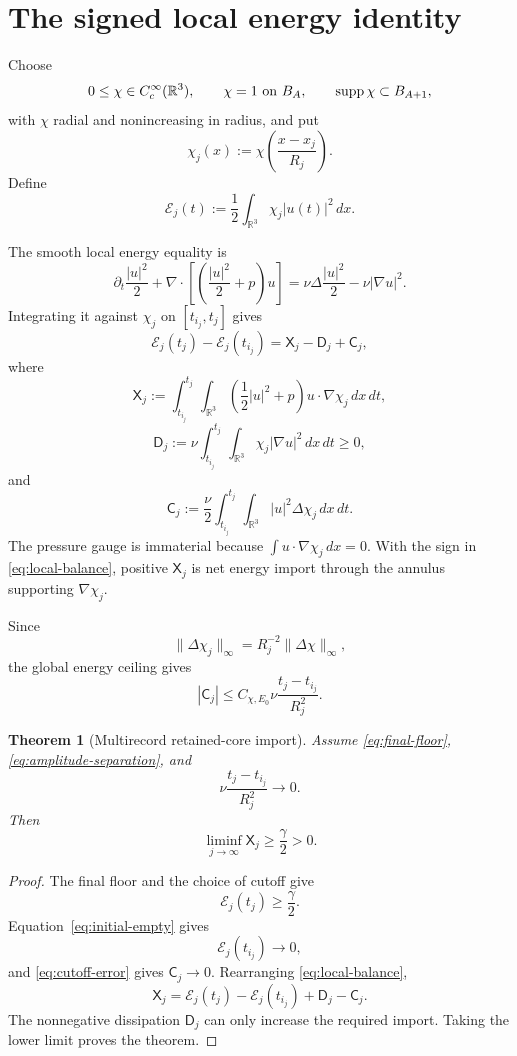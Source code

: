 \documentclass[11pt]{article}
\newtheorem{theorem}{Theorem}
\theoremstyle{remark}
\newcommand{\R}{\mathbb R}
\begin{document}
\section{The signed local energy identity}

Choose
\[
 0\le\chi\in C_c^\infty(\R^3),
 \qquad
 \chi=1\ \hbox{on }B_A,
 \qquad
 \operatorname{supp}\chi\subset B_{A+1},
\]
with \(\chi\) radial and nonincreasing in radius, and put
\[
 \chi_j(x):=
 \chi\left(\frac{x-x_j}{R_j}\right).
\]
Define
\[
 \mathcal E_j(t)
 :=
 \frac12\int_{\R^3}\chi_j|u(t)|^2\,dx.
\]

The smooth local energy equality is
\[
 \partial_t\frac{|u|^2}{2}
 +
 \nabla\cdot
 \left[
 \left(\frac{|u|^2}{2}+p\right)u
 \right]
 =
 \nu\Delta\frac{|u|^2}{2}
 -
 \nu|\nabla u|^2.
\]
Integrating it against \(\chi_j\) on \([t_{i_j},t_j]\) gives
\begin{equation}
 \label{eq:local-balance}
 \boxed{
 \mathcal E_j(t_j)-\mathcal E_j(t_{i_j})
 =
 \mathsf X_j-\mathsf D_j+\mathsf C_j,
 }
\end{equation}
where
\[
 \mathsf X_j
 :=
 \int_{t_{i_j}}^{t_j}\!\!\int_{\R^3}
 \left(\frac12|u|^2+p\right)
 u\cdot\nabla\chi_j\,dx\,dt,
\]
\[
 \mathsf D_j
 :=
 \nu\int_{t_{i_j}}^{t_j}\!\!\int_{\R^3}
 \chi_j|\nabla u|^2\,dx\,dt
 \ge0,
\]
and
\[
 \mathsf C_j
 :=
 \frac{\nu}{2}
 \int_{t_{i_j}}^{t_j}\!\!\int_{\R^3}
 |u|^2\Delta\chi_j\,dx\,dt.
\]
The pressure gauge is immaterial because
\(\int u\cdot\nabla\chi_j\,dx=0\).  With the sign in
\eqref{eq:local-balance}, positive \(\mathsf X_j\) is net energy import
through the annulus supporting \(\nabla\chi_j\).

Since
\[
 \|\Delta\chi_j\|_\infty
 =
 R_j^{-2}\|\Delta\chi\|_\infty,
\]
the global energy ceiling gives
\begin{equation}
 \label{eq:cutoff-error}
 \boxed{
 |\mathsf C_j|
 \le
 C_{\chi,E_0}\nu\frac{t_j-t_{i_j}}{R_j^2}.
 }
\end{equation}

\begin{theorem}[Multirecord retained-core import]
\label{thm:import}
Assume \eqref{eq:final-floor}, \eqref{eq:amplitude-separation}, and
\[
 \nu\frac{t_j-t_{i_j}}{R_j^2}\longrightarrow0.
\]
Then
\[
 \boxed{
 \liminf_{j\to\infty}\mathsf X_j
 \ge\frac{\gamma}{2}>0.
 }
\]
\end{theorem}

\begin{proof}
The final floor and the choice of cutoff give
\[
 \mathcal E_j(t_j)\ge\frac{\gamma}{2}.
\]
Equation~\eqref{eq:initial-empty} gives
\[
 \mathcal E_j(t_{i_j})\longrightarrow0,
\]
and \eqref{eq:cutoff-error} gives \(\mathsf C_j\to0\).
Rearranging \eqref{eq:local-balance},
\[
 \mathsf X_j
 =
 \mathcal E_j(t_j)-\mathcal E_j(t_{i_j})
 +
 \mathsf D_j-\mathsf C_j.
\]
The nonnegative dissipation \(\mathsf D_j\) can only increase the required
import.  Taking the lower limit proves the theorem.
\end{proof}
\end{document}
